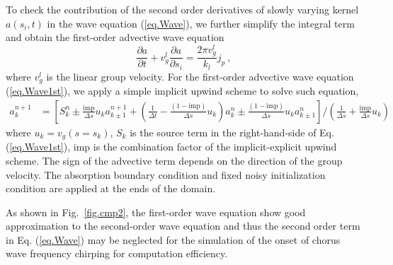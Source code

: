  To check the contribution of the second order derivatives of slowly varying kernel $a(s_i,t)$ in the wave equation (\ref{eq.Wave}), 
 we further simplify the integral term and obtain the first-order advective wave equation 
\begin{equation}\label{eq.Wave1st}
    \frac{\partial a}{\partial t} + v^l_{g} \frac{\partial a}{\partial s_i} = \frac{2\pi v^l_g}{k_l} j_{p}~,
\end{equation}
where $v_g^l$ is the linear group velocity.
For the first-order advective wave equation (\ref{eq.Wave1st}), we apply a simple implicit upwind scheme to solve such equation,
\begin{equation}
    \begin{aligned}
    a^{n+1}_k &= \left[ S_k^n \pm  \frac{\mathrm{imp}}{\Delta s}  {u_k} a_{k\pm1}^{n+1} + \left(\frac{1}{\Delta t} - \frac{(1- \mathrm{imp})}{\Delta s} u_k\right)  a_{k}^{n} \pm  \frac{(1-\mathrm{imp})}{\Delta s} u_k a_{k \pm 1}^{n} \right]/\left(\frac{1}{\Delta s} + \frac{\mathrm{imp}}{\Delta s}u_k\right)
    \end{aligned}
\end{equation}
where $u_k = v_g(s=s_k)$, $S_k$ is the source term in the right-hand-side of Eq. (\ref{eq.Wave1st}), $\mathrm{imp}$ is the combination factor of the implicit-explicit upwind scheme. 
The sign of the advective term depends on the direction of the group velocity. The absorption boundary condition and fixed noisy initialization condition are applied at the ends of the domain.

As shown in Fig.~\ref{fig.cmp2}, 
the first-order wave equation show good approximation to the second-order wave equation and  
thus 
 the second order term in Eq. (\ref{eq.Wave})
may be neglected for the simulation of the onset of chorus wave frequency chirping
for computation efficiency.

